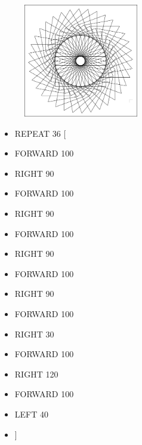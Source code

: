 \begin{minipage}{0.5\textwidth}

\begin{figure}[H]
   \includegraphics[width=5.0cm,trim=4 4 6 4,clip]{./images/marta/mar-12.png}
   \label{mar-14}
\end{figure}
\end{minipage} \hfill
\begin{minipage}{0.45\textwidth}
\begin{itemize}[itemsep=-3pt,parsep=2pt]
\item[] \hspace{0.5cm} REPEAT 36 [
\item[] \hspace{0.5cm} 	FORWARD 100
\item[] \hspace{0.5cm} 	RIGHT 90
\item[] \hspace{0.5cm} 	FORWARD 100
\item[] \hspace{0.5cm} 	RIGHT 90
\item[] \hspace{0.5cm} 	FORWARD 100
\item[] \hspace{0.5cm} 	RIGHT 90
\item[] \hspace{0.5cm} 	FORWARD 100
\item[] \hspace{0.5cm} 	RIGHT 90
\item[] \hspace{0.5cm} 	FORWARD 100
\item[] \hspace{0.5cm} 	RIGHT 30
\item[] \hspace{0.5cm} 	FORWARD 100
\item[] \hspace{0.5cm} 	RIGHT 120
\item[] \hspace{0.5cm} 	FORWARD 100
\item[] \hspace{0.5cm} 	LEFT 40
\item[] \hspace{0.5cm} 	]          
\end{itemize}          	          
\end{minipage}

